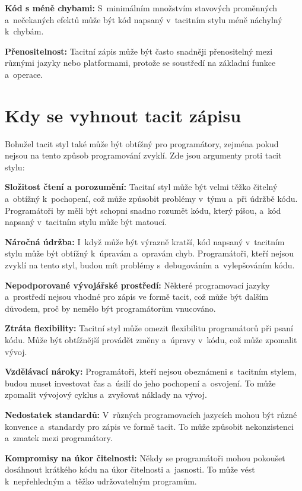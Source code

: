 \documentclass[male, czech]{kithesis}
\begin{document}
\textbf{Kód s méně chybami:}
S~minimálním množstvím stavových proměnných
a~nečekaných efektů může být kód napsaný v~tacitním stylu méně náchylný k~chybám.

\textbf{Přenositelnost:}
Tacitní zápis může být často snadněji přenositelný mezi různými jazyky nebo platformami, 
protože se soustředí na základní funkce a~operace.


\section{Kdy se vyhnout tacit zápisu}

Bohužel tacit styl také může být obtížný pro programátory, 
zejména pokud nejsou na tento způsob programování zvyklí. 
Zde jsou argumenty proti tacit stylu:

\textbf{Složitost čtení a porozumění:} 
Tacitní styl může být velmi těžko čitelný a~obtížný k~pochopení, 
což může způsobit problémy v~týmu a~při údržbě kódu. 
Programátoři by měli být schopni snadno rozumět kódu,
který píšou, a~kód napsaný v~tacitním stylu může být matoucí.

\textbf{Náročná údržba:}
I~když může být výrazně kratší, 
kód napsaný v~tacitním stylu může být obtížný k~úpravám a~opravám chyb. 
Programátoři, kteří nejsou zvyklí na tento styl, 
budou mít problémy s~debugováním a~vylepšováním kódu.

\textbf{Nepodporované vývojářské prostředí:}
Některé programovací jazyky
a~prostředí nejsou vhodné pro zápis ve formě tacit, 
což může být dalším důvodem, 
proč by nemělo být programátorům vnucováno.

\textbf{Ztráta flexibility:}
Tacitní styl může omezit flexibilitu programátorů při psaní kódu.
Může být obtížnější provádět změny
a~úpravy v~kódu, což může zpomalit vývoj.

\textbf{Vzdělávací nároky:}
Programátoři, 
kteří nejsou obeznámeni s~tacitním stylem, 
budou muset investovat čas a~úsilí do jeho pochopení a~osvojení. 
To může zpomalit vývojový cyklus a~zvyšovat náklady na vývoj.

\textbf{Nedostatek standardů:}
V~různých programovacích jazycích mohou být různé konvence
a~standardy pro zápis ve formě tacit. 
To může způsobit nekonzistenci a~zmatek mezi programátory.

\textbf{Kompromisy na úkor čitelnosti:}
Někdy se programátoři mohou pokoušet dosáhnout krátkého kódu na úkor čitelnosti a~jasnosti. 
To může vést k~nepřehledným a~těžko udržovatelným programům.
\end{document}
